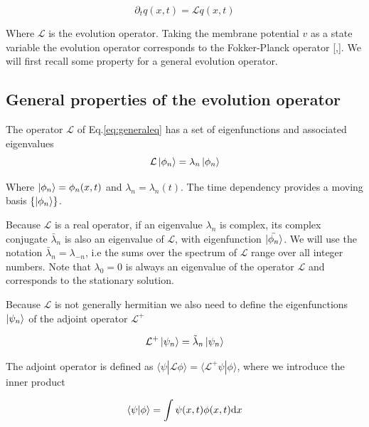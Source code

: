 \documentclass[12pt,twoside]{report}
\def \dd  {{\rm d}}
\begin{document}
\begin{equation}
\label{eq:generaleq}
\partial_t q(x,t)=\mathcal{L}q(x,t)
\end{equation}

Where $\mathcal{L}$  is the evolution operator. Taking the membrane potential $v$ as a state variable the evolution operator corresponds to the Fokker-Planck operator [\cite{MatGiu02},\cite{SchOst13}]. We will first recall some property for a general evolution operator.


\subsection{General properties of the evolution operator}
The operator $\mathcal{L}$ of Eq.\ref{eq:generaleq} has a set of eigenfunctions and associated eigenvalues
\begin{equation}
\label{eq:fokkerplanckoperator}
\mathcal{L}\ket{\phi_n}=\lambda_n\ket{\phi_n}
\end{equation}

Where $\ket{\phi_n}=\phi_n(x,t)$ and $\lambda_n=\lambda_n(t)$.
The time dependency provides a moving basis $\{\ket{\phi_n}\}$. 

Because $\mathcal{L}$ is a real operator, if an eigenvalue $\lambda_n$ is complex, its complex conjugate $\bar{\lambda}_n$  is also an eigenvalue of $\mathcal{L}$, with eigenfunction $\ket{\bar{\phi_n}}$. We will use the notation $\bar{\lambda}_n=\lambda_{-n}$, i.e the sums over the spectrum of $\mathcal{L}$ range over all integer numbers. Note that $\lambda_0=0$ is always an eigenvalue of the operator $\mathcal{L}$ and corresponds to the stationary solution.

Because $\mathcal{L}$ is not generally hermitian we also need to define the eigenfunctions $\ket{\psi_n}$ of the adjoint operator $\mathcal{L}^{+}$ 

\begin{equation}
\label{eq:fokkerplanckoperatordega}
\mathcal{L}^+\ket{\psi_n}=\tilde{\lambda}_n\ket{\psi_n}
\end{equation}

The adjoint operator is defined as $\langle\psi|\mathcal{L}\phi\rangle=\langle\mathcal{L}^+\psi|\phi\rangle$, where we introduce the inner product

\begin{equation}
\label{eq:innerproduct}
\langle\psi|\phi\rangle=\int\psi(x,t)\phi(x,t)\dd x
\end{equation}
\end{document}
